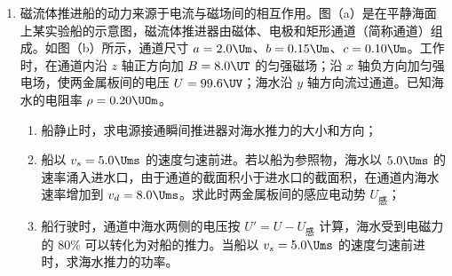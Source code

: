 \documentclass[\gkver]{gaokaozhenti}
\begin{document}
\begin{enumerate}
\begin{enumerate}
	\item
	在 $t = 0$ 时刻释放该带电粒子，释放瞬间粒子加速度的大小；
	\item
	若 A 板电势变化周期 $T = 1.0\times10^{-5}\Us$，在 $t = 0$ 时将带电粒子从紧临 B 板处无初速释放，粒子到达 A 板时动量的大小；
	\item
	A 板电势变化频率多大时，在 $t = \frac{T}{4}$ 到 $t = \frac{T}{2}$ 时间内从紧临 B 板处无初速释放该带电粒子，粒子不能到达 A 板。
\end{enumerate}


\item
磁流体推进船的动力来源于电流与磁场间的相互作用。图（a）是在平静海面上某实验船的示意图，磁流体推进器由磁体、电极和矩形通道（简称通道）组成。如图（b）所示，通道尺寸 $a = 2.0\Um$、$b = 0.15\Um$、$c = 0.10\Um$。工作时，在通道内沿 $z$ 轴正方向加 $B = 8.0\UT$ 的匀强磁场；沿 $x$ 轴负方向加匀强电场，使两金属板间的电压 $U = 99.6\UV$；海水沿 $y$ 轴方向流过通道。已知海水的电阻率 $\rho = 0.20\UOm$。

\begin{enumerate}
	\item
	船静止时，求电源接通瞬间推进器对海水推力的大小和方向；
	\item
	船以 $v_{s} = 5.0\Ums$ 的速度匀速前进。若以船为参照物，海水以 $5.0\Ums$ 的速率涌入进水口，由于通道的截面积小于进水口的截面积，在通道内海水速率增加到 $v_{d} = 8.0\Ums$。求此时两金属板间的感应电动势 $U_{\text{感}}$；
	\item
	船行驶时，通道中海水两侧的电压按 $U' = U - U_{\text{感}}$ 计算，海水受到电磁力的 $80\%$ 可以转化为对船的推力。当船以 $v_{s} = 5.0\Ums$ 的速度匀速前进时，求海水推力的功率。
\end{enumerate}


\end{enumerate}
\end{document}
